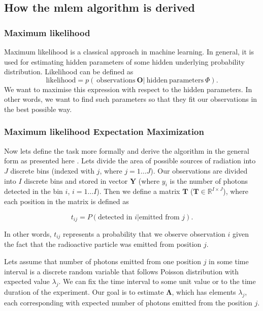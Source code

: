 \subsection{How the mlem algorithm is derived}

\subsubsection{Maximum likelihood}
Maximum likelihood is a classical approach in machine learning.
In general, it is used for estimating hidden parameters of some hidden underlying probability distribution.
Likelihood can be defined as 
\begin{equation}
  \mathrm{likelihood} = p(\ \mathrm{observations } \  \boldsymbol{O} | \ \mathrm{hidden \ parameters\ } \Phi ).
  \label{eq:likelihood}
\end{equation}
We want to maximise this expression with respect to the hidden parameters.
In other words, we want to find such parameters so that they fit our observations in the best possible way.

\subsubsection{Maximum likelihood Expectation Maximization}
Now lets define the task more formally and derive the algorithm in the general form as presented here \cite{}.
Lets divide the area of possible sources of radiation into $J$ discrete bins (indexed with $j$, where $j = 1 \dotsc J$).
Our observations are divided into $I$ discrete bins and stored in vector $\mathbf{Y}$ (where $y_{i}$ is the number of photons detected in the bin $i$, $i = 1 \dotsc I$).
Then we define a matrix $\mathbf{T}$ ($\mathbf{T} \in \mathbb{R}^{I \times J}$), where each position in the matrix is defined as

\begin{equation}
  t_{ij} =  P(\textrm{detected in } i | \textrm{emitted from } j).
\end{equation}

In other words, $t_{ij}$ represents a probability that we observe observation $i$ given the fact that the radioactive particle was emitted from position $j$.

Lets assume that number of photons emitted from one position $j$ in some time interval is a discrete random variable that follows Poisson distribution with expected value $\lambda_{j}$.
We can fix the time interval to some unit value or to the time duration of the experiment.
Our goal is to estimate $\mathbf{\Lambda}$, which has elements $\lambda_{j}$, each corresponding with expected number of photons emitted from the position $j$.

